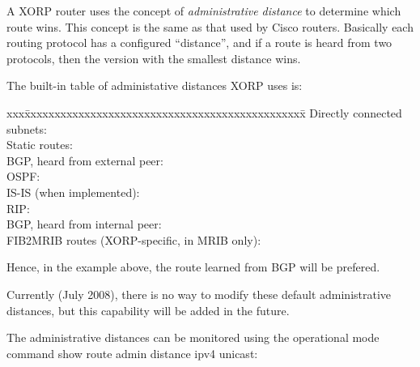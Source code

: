 A XORP router uses the concept of {\it administrative distance} to
determine which route wins.  This concept is the same as that used by
Cisco routers.  Basically each routing protocol has a configured
``distance'', and if a route is heard from two protocols, then the
version with the smallest distance wins.

The built-in table of administative distances XORP uses is:
\begin{tabbing}
xxx\=xxxxxxxxxxxxxxxxxxxxxxxxxxxxxxxxxxxxxxxxxxxxxxx\=\kill
\>Directly connected subnets: \\
\>Static routes:\\
\>BGP, heard from external peer:\\
\>OSPF:\\
\>IS-IS (when implemented):\\
\>RIP:\\
\>BGP, heard from internal peer:\\
\>FIB2MRIB routes (XORP-specific, in MRIB only):
\end{tabbing}
Hence, in the example above, the route learned from BGP will be prefered.

Currently (July 2008), there is no way to modify these default
administrative distances, but this capability will be added in the future.

The administrative distances can be monitored using the operational mode 
command {\stt show route admin distance ipv4 unicast}: \\

\vspace{0.1in}
\noindent{}

